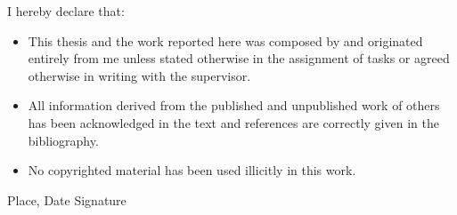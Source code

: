 I hereby declare that:
\begin{itemize}
\item This thesis and the work reported here was composed by and originated entirely from me unless stated otherwise in the assignment of tasks or agreed otherwise in writing with the supervisor.
\item All information derived from the published and unpublished work of others has been acknowledged in the text and references are correctly given in the bibliography. 
\item No copyrighted material has been used illicitly in this work.
\newline
\end{itemize} 
Place, Date \hfill Signature